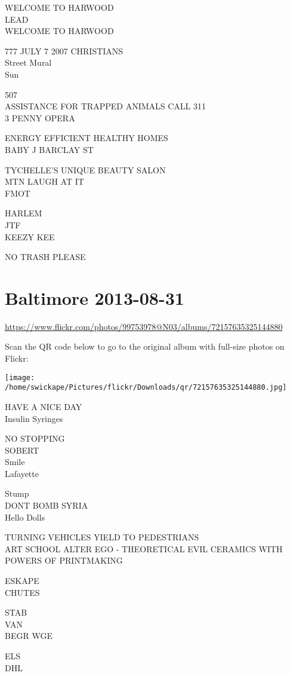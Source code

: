 \documentclass[10pt,letterpaper]{article}
\begin{document}
WELCOME TO HARWOOD\\
LEAD\\
WELCOME TO HARWOOD

777 JULY 7 2007 CHRISTIANS\\
Street Mural\\
Sun

507\\
ASSISTANCE FOR TRAPPED ANIMALS CALL 311\\
3 PENNY OPERA

ENERGY EFFICIENT HEALTHY HOMES\\
BABY J BARCLAY ST

TYCHELLE'S UNIQUE BEAUTY SALON\\
MTN LAUGH AT IT\\
FMOT

HARLEM\\
JTF\\
KEEZY KEE

NO TRASH PLEASE
\pagebreak

\section*{Baltimore 2013-08-31}

\url{https://www.flickr.com/photos/99753978@N03/albums/72157635325144880}

Scan the QR code below to go to the original album with full-size photos on Flickr:

\texttt{[image: /home/swickape/Pictures/flickr/Downloads/qr/72157635325144880.jpg]}
\pagebreak

HAVE A NICE DAY\\
Insulin Syringes

NO STOPPING\\
SOBERT\\
Smile\\
Lafayette

Stump\\
DONT BOMB SYRIA\\
Hello Dolls

TURNING VEHICLES YIELD TO PEDESTRIANS\\
ART SCHOOL ALTER EGO {-} THEORETICAL EVIL CERAMICS WITH POWERS OF PRINTMAKING

ESKAPE\\
CHUTES

STAB\\
VAN\\
BEGR WGE

ELS\\
DHL
\end{document}
